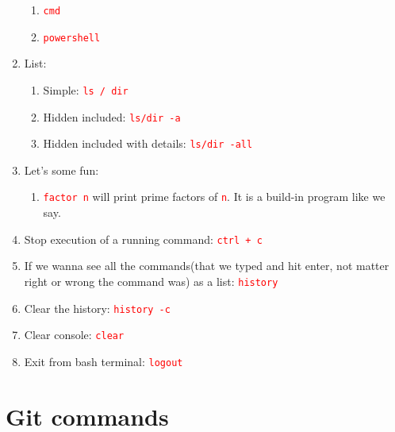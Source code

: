 \documentclass[12 pt, letterpaper]{extarticle}
\newcommand{\R}{\textcolor{red}} %
\newcommand{\T}{\texttt}
\begin{document}
\begin{enumerate}
\begin{enumerate}
			\item \R{\T{cmd}}
			\item \R{\T{powershell}}
		\end{enumerate}
	
	\item List:
		\begin{enumerate}
			\item Simple: \R{\T{ls / dir}}
			\item Hidden included: \R{\T{ls/dir -a}}
			\item Hidden included with details: \R{\T{ls/dir -all}}
		\end{enumerate}
		
	\item Let's some fun:
		\begin{enumerate}
			\item \R{\T{factor n}} will print prime factors of \R{\T{n}}. It is a build-in program like we say.
		\end{enumerate}
	
	\item Stop execution of a running command: \R{\T{ctrl + c}}
	\item If we wanna see all the commands(that we typed and hit enter, not matter right or wrong the command was) as a list: \R{\T{history}}
	\item Clear the history: \R{\T{history -c}}
	\item Clear console: \R{\T{clear}}
	\item Exit from bash terminal: \R{\T{logout}}
\end{enumerate}

\section*{Git commands}
\end{document}
